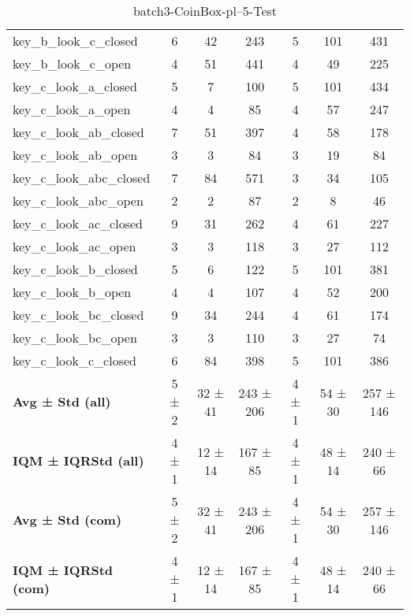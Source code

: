 \begin{table}[!ht]
\begin{tabular}{l|ccc|ccc}
key\_b\_look\_c\_closed & 6 & 42 & 243 & 5 & 101 & 431 \\
key\_b\_look\_c\_open & 4 & 51 & 441 & 4 & 49 & 225 \\
key\_c\_look\_a\_closed & 5 & 7 & 100 & 5 & 101 & 434 \\
key\_c\_look\_a\_open & 4 & 4 & 85 & 4 & 57 & 247 \\
key\_c\_look\_ab\_closed & 7 & 51 & 397 & 4 & 58 & 178 \\
key\_c\_look\_ab\_open & 3 & 3 & 84 & 3 & 19 & 84 \\
key\_c\_look\_abc\_closed & 7 & 84 & 571 & 3 & 34 & 105 \\
key\_c\_look\_abc\_open & 2 & 2 & 87 & 2 & 8 & 46 \\
key\_c\_look\_ac\_closed & 9 & 31 & 262 & 4 & 61 & 227 \\
key\_c\_look\_ac\_open & 3 & 3 & 118 & 3 & 27 & 112 \\
key\_c\_look\_b\_closed & 5 & 6 & 122 & 5 & 101 & 381 \\
key\_c\_look\_b\_open & 4 & 4 & 107 & 4 & 52 & 200 \\
key\_c\_look\_bc\_closed & 9 & 34 & 244 & 4 & 61 & 174 \\
key\_c\_look\_bc\_open & 3 & 3 & 110 & 3 & 27 & 74 \\
key\_c\_look\_c\_closed & 6 & 84 & 398 & 5 & 101 & 386 \\
\hline
\textbf{Avg ± Std (all)} & 5 ± 2 & 32 ± 41 & 243 ± 206 & 4 ± 1 & 54 ± 30 & 257 ± 146 \\
\textbf{IQM ± IQRStd (all)} & 4 ± 1 & 12 ± 14 & 167 ± 85 & 4 ± 1 & 48 ± 14 & 240 ± 66 \\
\textbf{Avg ± Std (com)} & 5 ± 2 & 32 ± 41 & 243 ± 206 & 4 ± 1 & 54 ± 30 & 257 ± 146 \\
\textbf{IQM ± IQRStd (com)} & 4 ± 1 & 12 ± 14 & 167 ± 85 & 4 ± 1 & 48 ± 14 & 240 ± 66 \\
\end{tabular}
\caption{batch3-CoinBox-pl--5-Test}
\label{tab:batch3_CoinBox_pl__5_comparison_test}
\end{table}

